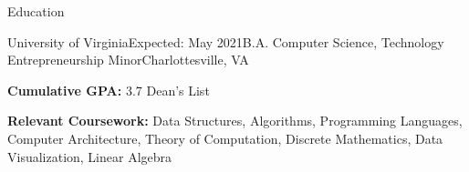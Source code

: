 \documentclass{resume}
\begin{document}
\vspace{-1em}
\begin{rSection}{Education}

  \begin{rSubsection}{University of Virginia}{Expected: May 2021}{B.A. Computer Science, Technology Entrepreneurship Minor}{Charlottesville, VA}

    \item \textbf{Cumulative GPA:} 3.7 \hspace{1.5ex} Dean's List
    \item \textbf{Relevant Coursework:} Data Structures, Algorithms, Programming Languages, Computer Architecture, Theory of Computation, Discrete Mathematics, Data Visualization, Linear Algebra
  \end{rSubsection}

\end{rSection}
\end{document}
